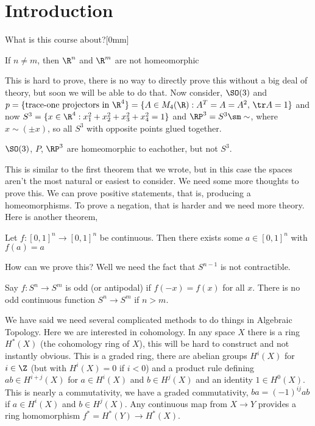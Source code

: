 
\section{Introduction}
What is this course about?[0mm]
\begin{nthm}
  If $n \ne m$, then $\R^n$ and $\R^m$ are not homeomorphic
\end{nthm}

\noindent
This is hard to prove, there is no way to directly prove this without a big deal of theory, but soon we will be able to do that. Now consider, $\SO(3)$ and $p = \{\text{trace-one projectors in } \R^4\} = \{A \in M_4(\R) : A^T = A = A^2, \, \tr A = 1\}$ and now $S^3 = \{x \in \R^4 : x_1^2 + x_2^2 + x_3^2 + x_4^2 = 1\}$ and $\RP^3 = S^3 \sm \sim$, where $x \sim (\pm x)$, so all $S^3$ with opposite points glued together.\\

\begin{nthm}
  $\SO(3)$, $P$, $\RP^3$ are homeomorphic to eachother, but not $S^3$.
\end{nthm}

\noindent
This is similar to the first theorem that we wrote, but in this case the spaces aren't the most natural or easiest to consider. We need some more thoughts to prove this. We can prove positive statements, that is, producing a homeomorphisms. To prove a negation, that is harder and we need more theory. Here is another theorem,

\begin{nthm}
  Let $f : [0, 1]^n \to [0, 1]^n$ be continuous. Then there exists some $a \in [0, 1]^n$ with $f(a) = a$
\end{nthm}

\noindent
How can we prove this? Well we need the fact that $S^{n-1}$ is not contractible.

\begin{nthm}
  Say $f : S^n \to S^m$ is odd (or antipodal) if $f(-x) = f(x)$ for all $x$. There is no odd continuous function $S^n \to S^m$ if $n > m$.
\end{nthm}

\noindent
We have said we need several complicated methods to do things in Algebraic Topology. Here we are interested in cohomology. In any space $X$ there is a ring $H^*(X)$ (the cohomology ring of $X$), this will be hard to construct and not instantly obvious. This is a graded ring, there are abelian groups $H^i(X)$ for $i \in \Z$ (but with $H^i(X) = 0$ if $i < 0$) and a product rule defining $ab \in H^{i + j}(X)$ for $a \in H^i(X)$ and $b \in H^j(X)$ and an identity $1 \in H^0(X)$. This is nearly a commutativity, we have a graded commutativity, $ba = (-1)^{ij}ab$ if $a \in H^i(X)$ and $b \in H^j(X)$. Any continuous map from $X \to Y$ provides a ring homomorphism $f^* = H^*(Y) \to H^*(X)$.\\

